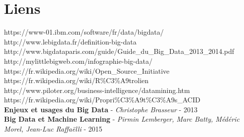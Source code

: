 \documentclass[12pt]{article}
\begin{document}
\newpage
\section*{Liens}
https://www-01.ibm.com/software/fr/data/bigdata/ \\
http://www.lebigdata.fr/definition-big-data \\
http://www.bigdataparis.com/guide/Guide\_du\_Big\_Data\_2013\_2014.pdf \\
http://mylittlebigweb.com/infographie-big-data/ \\
https://fr.wikipedia.org/wiki/Open\_Source\_Initiative \\
https://fr.wikipedia.org/wiki/R\%C3\%A9trolien \\
http://www.piloter.org/business-intelligence/datamining.htm \\
https://fr.wikipedia.org/wiki/Propri\%C3\%A9t\%C3\%A9s\_ACID \\
\textbf{Enjeux et usages du Big Data} - \textit{Christophe Brasseur} - 2013 \\
\textbf{Big Data et Machine Learning} - \textit{Pirmin Lemberger, Marc Batty, Médéric Morel, Jean-Luc Raffaëlli} - 2015
\end{document}
